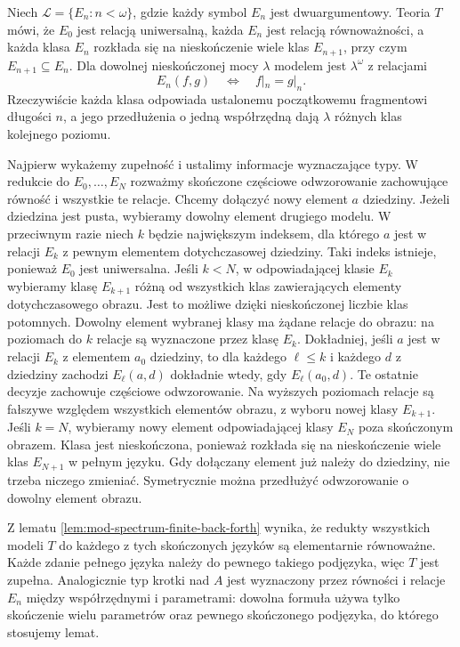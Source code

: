\begin{przyklad}
\label{ex:mod-spectrum-equivalence-tree}
Niech $\mathcal L=\{E_n:n<\omega\}$, gdzie
każdy symbol $E_n$ jest dwuargumentowy.
Teoria $T$ mówi, że $E_0$ jest relacją
uniwersalną, każda $E_n$ jest relacją
równoważności, a każda klasa $E_n$
rozkłada się na nieskończenie wiele klas
$E_{n+1}$, przy czym $E_{n+1}\subseteq E_n$.
Dla dowolnej nieskończonej mocy $\lambda$
modelem jest $\lambda^\omega$ z relacjami
\[
E_n(f,g)\quad\Longleftrightarrow\quad
f|_n=g|_n.
\]
Rzeczywiście każda klasa odpowiada ustalonemu
początkowemu fragmentowi długości $n$,
a jego przedłużenia o jedną współrzędną
dają $\lambda$ różnych klas kolejnego poziomu.

Najpierw wykażemy zupełność i ustalimy
informacje wyznaczające typy.
W redukcie do $E_0,\ldots,E_N$
rozważmy skończone częściowe odwzorowanie
zachowujące równość i wszystkie te relacje.
Chcemy dołączyć nowy element $a$ dziedziny.
Jeżeli dziedzina jest pusta, wybieramy
dowolny element drugiego modelu.
W przeciwnym razie niech $k$ będzie
największym indeksem, dla którego $a$
jest w relacji $E_k$ z pewnym elementem
dotychczasowej dziedziny. Taki indeks
istnieje, ponieważ $E_0$ jest uniwersalna.
Jeśli $k<N$, w odpowiadającej klasie $E_k$
wybieramy klasę $E_{k+1}$ różną od wszystkich
klas zawierających elementy dotychczasowego
obrazu. Jest to możliwe dzięki nieskończonej
liczbie klas potomnych. Dowolny element
wybranej klasy ma żądane relacje do obrazu:
na poziomach do $k$ relacje są wyznaczone
przez klasę $E_k$. Dokładniej, jeśli $a$ jest
w relacji $E_k$ z elementem $a_0$ dziedziny,
to dla każdego $\ell\leq k$ i każdego $d$
z dziedziny zachodzi $E_\ell(a,d)$ dokładnie
wtedy, gdy $E_\ell(a_0,d)$. Te ostatnie decyzje
zachowuje częściowe odwzorowanie. Na wyższych
poziomach relacje są fałszywe względem wszystkich
elementów obrazu, z wyboru nowej klasy $E_{k+1}$.
Jeśli $k=N$, wybieramy nowy element
odpowiadającej klasy $E_N$ poza skończonym
obrazem. Klasa jest nieskończona, ponieważ
rozkłada się na nieskończenie wiele klas
$E_{N+1}$ w pełnym języku.
Gdy dołączany element już należy do dziedziny,
nie trzeba niczego zmieniać.
Symetrycznie można przedłużyć odwzorowanie
o dowolny element obrazu.

Z lematu \ref{lem:mod-spectrum-finite-back-forth}
wynika, że redukty wszystkich modeli $T$
do każdego z tych skończonych języków
są elementarnie równoważne.
Każde zdanie pełnego języka należy do
pewnego takiego podjęzyka, więc $T$ jest
zupełna. Analogicznie typ krotki nad $A$
jest wyznaczony przez równości i relacje
$E_n$ między współrzędnymi i parametrami:
dowolna formuła używa tylko skończenie
wielu parametrów oraz pewnego skończonego
podjęzyka, do którego stosujemy lemat.


\end{przyklad}

